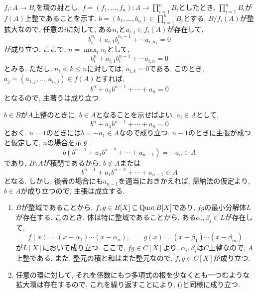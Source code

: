\documentclass[dvipdfmx]{jsarticle}
\begin{document}
    \begin{problem}
        $f_i: A \to B_i$を環の射とし, $f = (f_1, \dots, f_n): A \to \prod_{i = 1}^n B_i$としたとき,
        $\prod_{i = 1}^n B_i$が$f(A)$上整であることを示す.
        $b = (b_1, \dots, b_n) \in \prod_{i = 1}^n B_i$とする.
        $B/f_i(A)$が整拡大なので,
        任意の$i$に対して, ある$n_i$と$a_{i,j} \in f_i(A)$が存在して,
        \[
            b_i^{n_i} + a_{i,1}b_i^{n_i-1} + \cdots a_{i,n_1} = 0
        \]
        が成り立つ.
        ここで, $n = \max_i{n_i}$として,
        \[
            b_i^{n} + a_{i,1}b_i^{n-1} + \cdots a_{i,n} = 0
        \]
        とみる.
        ただし, $n_i < k \leq n$に対しては, $a_{i,k} = 0$である.
        このとき, $a_j = (a_{1,j}, \dots, a_{n,j}) \in f(A)$とすれば,
        \[
            b^n+ a_1 b^{n-1} + \cdots + a_n = 0
        \]
        となるので, 主著うは成り立つ.
    \end{problem}

    \begin{problem}
        $b \in B$が$A$上整のときに, $b \in A$となることを示せばよい.
        $a_i \in A$として,
        \[
            b^n + a_1b^{n-1} + \cdots + a_n = 0
        \]
        とおく.
        $n = 1$のときには$b = -a_1 \in A$なので成り立つ.
        $n-1$のときに主張が成つと仮定して, $n$の場合を示す.
        \[
            b(b^{n-1} + a_1b^{n-2} + \cdots + a_{n-1}) = -a_n \in A
        \]
        であり,
        $B \setminus A$が積閉であるから, $b \notin A$または
        \[
            b^{n-1} + a_1b^{n-2} + \cdots + a_{n-1} \in A
        \]
        となる.
        しかし, 後者の場合にも$a_{n-1}$を適当におきかえれば, 帰納法の仮定より, $b \in A$が成り立つので,
        主張は成立する.
    \end{problem}

    \begin{problem}
        \begin{enumerate}
            \item $B$が整域であることから, $f,g \in B[X] \subseteq \operatorname{Quot}{B}[X]$であり,
            $fg$の最小分解体$L$が存在する.
            このとき, 体は特に整域であることから, ある$\alpha_i, \beta_i \in L$が存在して,
            \[
                f(x) = (x-\alpha_1)\cdots (x-\alpha_n), \quad \quad g(x) = (x-\beta_1)\cdots (x-\beta_m)
            \]
            が$L[X]$において成り立つ.
            ここで, $fg \in C[X]$より, $\alpha_i, \beta_i$は$C$上整なので, $A$上整である.
            また, 整元の積と和はまた整元なので, $f, g \in C[X]$が成り立つ.
            \item 任意の環に対して, それを係数にもつ多項式の根を少なくとも一つむような拡大環は存在するので,
            これを繰り返すことにより, i)と同様に成り立つ.
        \end{enumerate}
    \end{problem}
\end{document}

